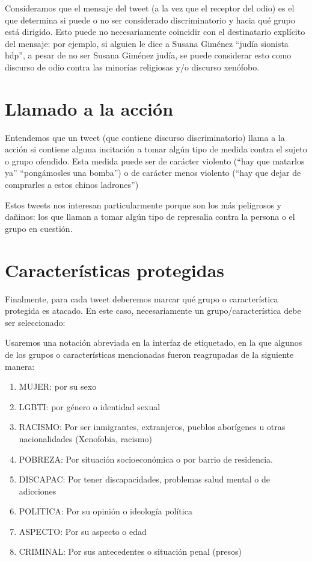 Consideramos que el mensaje del tweet (a la vez que el receptor del odio) es el que determina si puede o no ser considerado discriminatorio y hacia qué grupo está dirigido. Esto puede no necesariamente coincidir con el destinatario explícito del mensaje: por ejemplo, si alguien le dice a Susana Giménez “judía sionista hdp”, a pesar de no ser Susana Giménez judía, se puede considerar esto como discurso de odio contra las minorías religiosas y/o discurso xenófobo.


\section{Llamado a la acción}

Entendemos que un tweet (que contiene discurso discriminatorio) llama a la acción si contiene alguna incitación a tomar algún tipo de medida contra el sujeto o grupo ofendido. Esta medida puede ser de carácter violento (“hay que matarlos ya” “pongámosles una bomba”) o de carácter menos violento (“hay que dejar de comprarles a estos chinos ladrones”)

Estos tweets nos interesan particularmente porque son los más peligrosos y dañinos: los que llaman a tomar algún tipo de represalia contra la persona o el grupo en cuestión.

\section{Características protegidas}

Finalmente, para cada tweet deberemos marcar qué grupo o característica protegida es atacado. En este caso, necesariamente un grupo/característica debe ser seleccionado:

Usaremos una notación abreviada en la interfaz de etiquetado, en la que algunos de los grupos o características mencionadas fueron reagrupadas de la siguiente manera:

\begin{enumerate}
    \item MUJER: por su sexo
    \item LGBTI: por género o identidad sexual
    \item RACISMO: Por ser inmigrantes, extranjeros, pueblos aborígenes u otras nacionalidades (Xenofobia, racismo)
    \item POBREZA: Por situación socioeconómica o por barrio de residencia.
    \item DISCAPAC: Por tener discapacidades, problemas salud mental o de adicciones
    \item POLITICA: Por su opinión o ideología política
    \item ASPECTO: Por su aspecto o edad
    \item CRIMINAL: Por sus antecedentes o situación penal (presos)
\end{enumerate}


